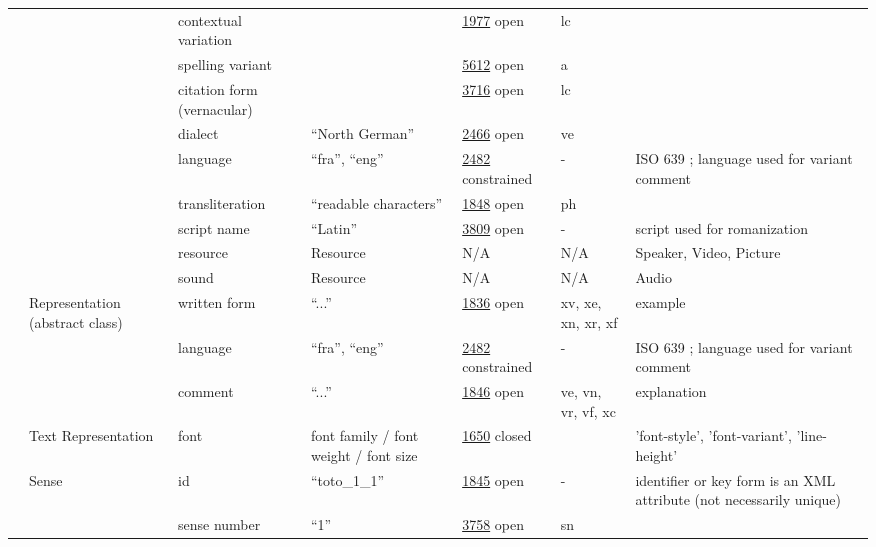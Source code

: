 \documentclass[a4paper,12pt]{article}
\begin{document}
\begin{center}
\begin{longtable}{*7{p{2cm}}}
& & contextual variation & & \href{http://www.isocat.org/datcat/DC-1977}{1977} open & lc & \\ \cmidrule{3-7}
& & spelling variant & & \href{http://www.isocat.org/datcat/DC-5612}{5612} open & a & \\ \cmidrule{3-7}
& & citation form (vernacular) & & \href{http://www.isocat.org/datcat/DC-3716}{3716} open & lc & \\ \cmidrule{3-7}
& & dialect & ``North German'' & \href{http://www.isocat.org/datcat/DC-2466}{2466} open & ve & \\ \cmidrule{3-7}
& & language & ``fra'', ``eng'' & \href{http://www.isocat.org/datcat/DC-2482}{2482} constrained & - & ISO 639 ; language used for variant comment \\ \cmidrule{3-7}
& & trans\-li\-te\-ra\-tion & ``readable characters'' & \href{http://www.isocat.org/datcat/DC-1848}{1848} open & ph & \\ \cmidrule{3-7}
& & script name & ``Latin'' & \href{http://www.isocat.org/datcat/DC-3809}{3809} open & - & script used for romanization \\ \cmidrule{3-7}
& & resource & Resource & N/A & N/A & Speaker, Video, Picture \\ \cmidrule{3-7}
& & sound & Resource & N/A & N/A & Audio \\ \cmidrule{2-7}
& \multirow{3}{2cm}{Re\-pre\-sen\-ta\-tion (abstract class)} & written form & ``...'' & \href{http://www.isocat.org/datcat/DC-1836}{1836} open & xv, xe, xn, xr, xf & example \\ \cmidrule{3-7}
& & language & ``fra'', ``eng'' & \href{http://www.isocat.org/datcat/DC-2482}{2482} constrained & - & ISO 639 ; language used for variant comment \\ \cmidrule{3-7}
& & comment & ``...'' & \href{http://www.isocat.org/datcat/DC-1846}{1846} open & ve, vn, vr, vf, xc & explanation \\ \cmidrule{2-7}
& \multirow{1}{2cm}{Text Re\-pre\-sen\-ta\-tion} & font & font family / font weight / font size & \href{http://www.isocat.org/datcat/DC-1650}{1650} closed & & 'font-style', 'font-variant', 'line-height' \\ \cmidrule{2-7}
& \multirow{9}{2cm}{Sense} & id & ``toto\_1\_1'' & \href{http://www.isocat.org/datcat/DC-1845}{1845} open & - & identifier or key form is an XML attribute (not necessarily unique) \\ \cmidrule{3-7}
& & sense number & ``1'' & \href{http://www.isocat.org/datcat/DC-3758}{3758} open & sn & \\ \cmidrule{3-7}

\end{longtable}
\end{center}
\end{document}
